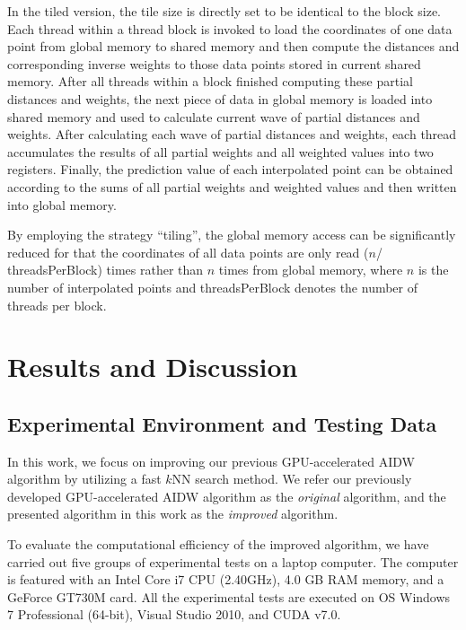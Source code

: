 \documentclass[final,5p,times,twocolumn,authoryear]{elsarticle}
\begin{document}
			In the tiled version, the tile size is directly set to be identical to the 
			block size. Each thread within a thread block is invoked to load the 
			coordinates of one data point from global memory to shared memory and then 
			compute the distances and corresponding inverse weights to those data points 
			stored in current shared memory. After all threads within a block finished 
			computing these partial distances and weights, the next piece of data in 
			global memory is loaded into shared memory and used to calculate current 
			wave of partial distances and weights. After calculating each wave of 
			partial distances and weights, each thread accumulates the results of all 
			partial weights and all weighted values into two registers. Finally, the 
			prediction value of each interpolated point can be obtained according to the 
			sums of all partial weights and weighted values and then written into global 
			memory.
			
			By employing the strategy ``tiling'', the global memory access can be 
			significantly reduced for that the coordinates of all data points are only 
			read ($n $/ threadsPerBlock) times rather than $n$ times from global memory, where 
			$n$ is the number of interpolated points and threadsPerBlock denotes the number 
			of threads per block. 

		
			
			\section{Results and Discussion}
			
			\subsection{Experimental Environment and Testing Data }
			In this work, we focus on improving our previous GPU-accelerated AIDW 
			algorithm by utilizing a fast $k$NN search method. We refer our previously 
			developed GPU-accelerated AIDW algorithm as the \textit{original} algorithm, and the 
			presented algorithm in this work as the \textit{improved} algorithm. 
			
			To evaluate the computational efficiency of the improved algorithm, we have 
			carried out five groups of experimental tests on a laptop computer. The 
			computer is featured with an Intel Core i7 CPU (2.40GHz), 4.0 GB RAM memory, 
			and a GeForce GT730M card. All the experimental tests are executed on OS 
			Windows 7 Professional (64-bit), Visual Studio 2010, and CUDA v7.0.
			
\end{document}
